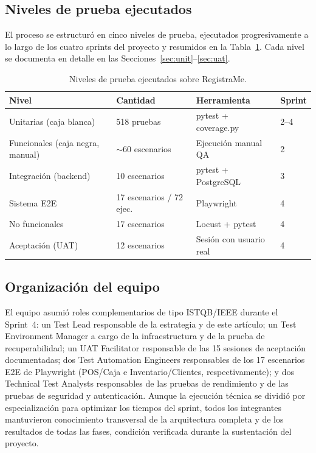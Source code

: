 \documentclass[conference]{IEEEtran}
\begin{document}
\subsection{Niveles de prueba ejecutados}

El proceso se estructuró en cinco niveles de prueba, ejecutados progresivamente a lo largo de los cuatro sprints del proyecto y resumidos en la Tabla~\ref{tab:levels}. Cada nivel se documenta en detalle en las Secciones~\ref{sec:unit}--\ref{sec:uat}.

\begin{table}[htbp]
  \caption{Niveles de prueba ejecutados sobre RegistraMe.}
  \label{tab:levels}
  \centering
  \footnotesize
  \begin{tabular}{p{2.1cm} p{1.3cm} p{1.6cm} p{1.5cm}}
    \toprule
    \textbf{Nivel} & \textbf{Cantidad} & \textbf{Herramienta} & \textbf{Sprint} \\
    \midrule
    Unitarias (caja blanca) & 518 pruebas & pytest + coverage.py & 2--4 \\
    Funcionales (caja negra, manual) & $\sim$60 escenarios & Ejecución manual QA & 2 \\
    Integración (backend) & 10 escenarios & pytest + PostgreSQL & 3 \\
    Sistema E2E & 17 escenarios / 72 ejec. & Playwright & 4 \\
    No funcionales & 17 escenarios & Locust + pytest & 4 \\
    Aceptación (UAT) & 12 escenarios & Sesión con usuario real & 4 \\
    \bottomrule
  \end{tabular}
\end{table}

\subsection{Organización del equipo}

El equipo asumió roles complementarios de tipo ISTQB/IEEE durante el Sprint~4: un Test Lead responsable de la estrategia y de este artículo; un Test Environment Manager a cargo de la infraestructura y de la prueba de recuperabilidad; un UAT Facilitator responsable de las 15 sesiones de aceptación documentadas; dos Test Automation Engineers responsables de los 17 escenarios E2E de Playwright (POS/Caja e Inventario/Clientes, respectivamente); y dos Technical Test Analysts responsables de las pruebas de rendimiento y de las pruebas de seguridad y autenticación. Aunque la ejecución técnica se dividió por especialización para optimizar los tiempos del sprint, todos los integrantes mantuvieron conocimiento transversal de la arquitectura completa y de los resultados de todas las fases, condición verificada durante la sustentación del proyecto.
\end{document}
